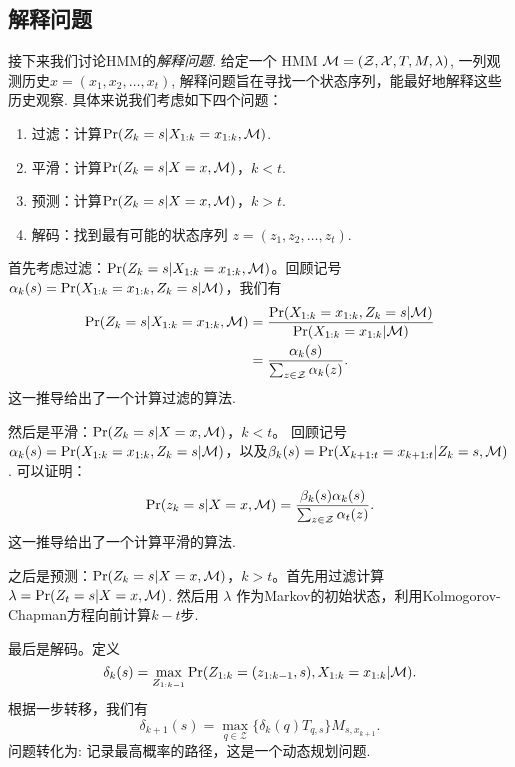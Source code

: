 \subsection{解释问题}
接下来我们讨论HMM的\emph{解释问题}. 给定一个 HMM $\mathcal M = (\mathcal Z, \mathcal X, T, M, \lambda)$, 一列观测历史$x = (x_1, x_2, \dots, x_t)$, 解释问题旨在寻找一个状态序列，能最好地解释这些历史观察. 具体来说我们考虑如下四个问题：
\begin{enumerate}
    \item 过滤：计算$\Pr(Z_k = s|X_{1:k}=x_{1:k}, \mathcal M)$.
    \item 平滑：计算$\Pr(Z_k = s|X=x, \mathcal M)$，$k < t$.
    \item 预测：计算$\Pr(Z_k = s|X=x, \mathcal M)$，$k > t$.
    \item 解码：找到最有可能的状态序列 $z = (z_1, z_2, \dots, z_t)$.
\end{enumerate}


首先考虑过滤：$\Pr(Z_k = s|X_{1:k}=x_{1:k}, \mathcal M)$。回顾记号$\alpha_k(s)= \Pr(X_{1:k}=x_{1:k}, Z_k=s| \mathcal M)$，我们有
    \begin{align*}
        \Pr(Z_k = s|X_{1:k}=x_{1:k}, \mathcal M) & = \frac{\Pr(X_{1:k}=x_{1:k}, Z_k=s| \mathcal M)}{\Pr(X_{1:k}=x_{1:k}| \mathcal M)} \\
        &= \frac{\alpha_k(s)}{\sum_{z\in\mathcal Z}\alpha_k(z)}.
    \end{align*}
这一推导给出了一个计算过滤的算法.

然后是平滑：$\Pr(Z_k = s|X=x, \mathcal M)$，$k < t$。 回顾记号$\alpha_k(s)= \Pr(X_{1:k}=x_{1:k}, Z_k=s| \mathcal M)$，以及$\beta_k(s)=\Pr(X_{k+1:t}=x_{k+1:t} |Z_k=s, \mathcal M)$. 可以证明：
        \[\Pr(z_k = s|X=x, \mathcal M)=\frac{\beta_k(s)\alpha_k(s)}{\sum_{z\in\mathcal Z}\alpha_t(z)}.
    \]
这一推导给出了一个计算平滑的算法.


之后是预测：$\Pr(Z_k = s|X=x, \mathcal M)$，$k > t$。首先用过滤计算 $\lambda=\Pr(Z_t = s|X=x, \mathcal M)$. 然后用 $\lambda$ 作为Markov的初始状态，利用Kolmogorov-Chapman方程向前计算$k-t$步.


最后是解码。定义 
    $$\delta_k(s) = \max_{Z_{1:k-1}}\Pr(Z_{1:k} = (z_{1:k-1}, s), X_{1:k}=x_{1:k}| \mathcal M).$$
根据一步转移，我们有
    $$\delta_{k+1}(s) = \max_{q\in \mathcal Z}\{\delta_k(q)T_{q,s}\}M_{s,x_{k+1}}.$$
问题转化为: 记录最高概率的路径，这是一个动态规划问题.


